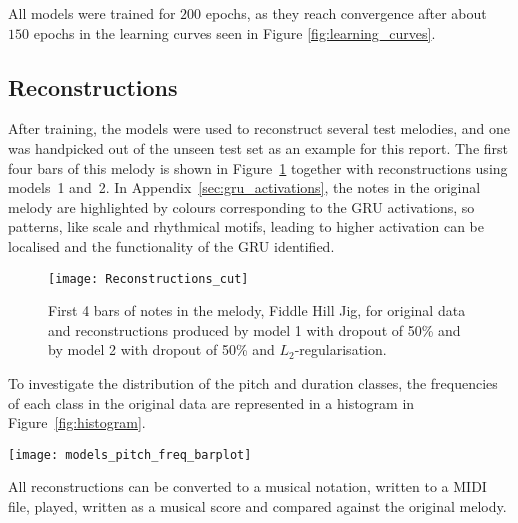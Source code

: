 All models were trained for $200$ epochs, as they reach convergence after about $150$ epochs in the learning curves seen in Figure \ref{fig:learning_curves}.

\subsection{Reconstructions}

After training, the models were used to reconstruct several test melodies, and one was handpicked out of the unseen test set as an example for this report.
The first four bars of this melody is shown in Figure~\ref{fig:reconstructions} together with reconstructions using models~1 and~2.
In Appendix~\ref{sec:gru_activations}, the notes in the original melody are highlighted by colours corresponding to the GRU activations, so patterns, like scale and rhythmical motifs, leading to higher activation can be localised and the functionality of the GRU identified.

\begin{figure}
    \centering
    \texttt{[image: Reconstructions\_cut]}
    \caption{First 4 bars of notes in the melody, Fiddle Hill Jig, for original data and reconstructions produced by model 1 with dropout of 50\% and by model 2 with dropout of 50\% and $L_2$-regularisation.}
    \label{fig:reconstructions}
\end{figure}

To investigate the distribution of the pitch and duration classes, the frequencies of each class in the original data are represented in a histogram in Figure~\ref{fig:histogram}.

\begin{figure*}
    \centering
    \texttt{[image: models\_pitch\_freq\_barplot]}
    \caption{Histograms showing statistical frequency of pitch classes in the (blue) original data and in the (green) reconstructions produced by model type 2 with dropout of 50\% and $L_2$-regularisation.}
    \label{fig:histogram}
\end{figure*}

All reconstructions can be converted to a musical notation, written to a MIDI file, played, written as a musical score and compared against the original melody.
